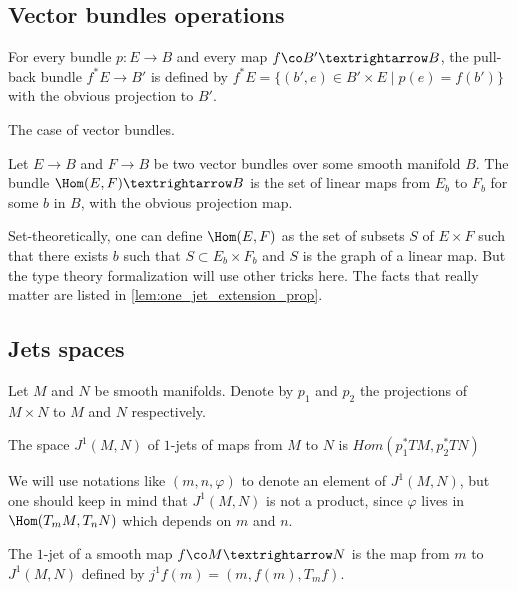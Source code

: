 \subsection{Vector bundles operations}
\label{sec:vector_bundles_operations}

\begin{definition}
\label{def:pull_back_bundle}
\leanok
{}
For every bundle $p : E → B$ and every map $f \co B' → B$,
the pull-back bundle $f^*E → B'$ is defined by
$f^*E = \{(b', e) ∈ B' × E \;|\; p(e) = f(b')\}$ with
the obvious projection to $B'$.
\end{definition}

The case of vector bundles.

\begin{definition}
\label{def:hom_bundle}
\leanok
{}
Let $E → B$ and $F → B$ be two vector bundles over some smooth manifold
$B$. The bundle $\Hom(E, F) → B$ is the set of linear maps from
$E_b$ to $F_b$ for some $b$ in $B$, with the obvious projection map.
\end{definition}

Set-theoretically, one can define $\Hom(E, F)$ as the set of subsets
$S$ of $E × F$ such that there exists $b$ such that $S ⊂ E_b × F_b$
and $S$ is the graph of a linear map. But the type theory formalization
will use other tricks here. The facts that really matter are listed in
\cref{lem:one_jet_extension_prop}.


\subsection{Jets spaces}

\begin{definition}
\label{def:one_jet_space}
\leanok
{}
Let $M$ and $N$ be smooth manifolds. Denote by
$p_1$ and $p_2$ the projections of $M × N$ to
$M$ and $N$ respectively.

The space $J^1(M, N)$ of $1$-jets of maps from $M$ to $N$ is
$Hom(p_1^*TM, p_2^*TN)$
\end{definition}

We will use notations like $(m, n, φ)$ to denote an element
of $J^1(M, N)$,
but one should keep in mind that $J^1(M, N)$ is not a product,
since $φ$ lives in $\Hom(T_mM, T_nN)$ which depends on $m$ and $n$.


\begin{definition}
\label{def:one_jet_extension}
\leanok
{}
The $1$-jet of a smooth map $f \co M → N$ is the map from
$m$ to $J^1(M, N)$ defined by $j^1f(m) = (m, f(m), T_mf)$.
\end{definition}

